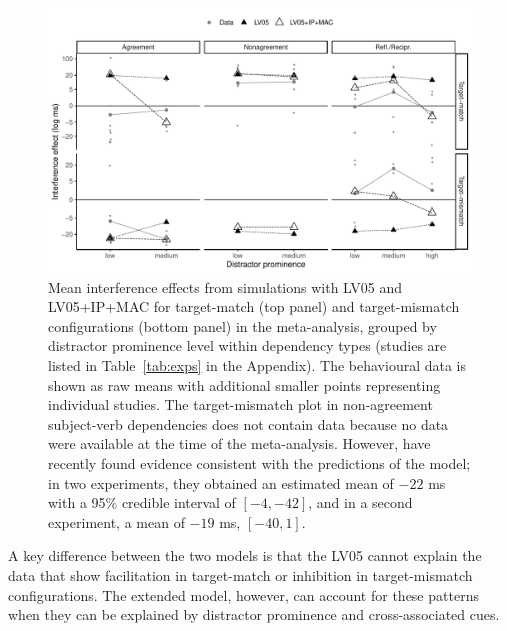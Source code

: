 \documentclass{cambridge7A}\usepackage[]{graphicx}\usepackage[]{color}
\begin{document}
\begin{figure}[!htbp]
\centering
\includegraphics[width=\textwidth]{figures/fig-simresults}

%
  \caption{Mean interference effects from simulations with LV05 and LV05+IP+MAC for target-match (top panel) and target-mismatch configurations (bottom panel) in the \cite{JaegerEngelmannVasishth2017} meta-analysis, grouped by distractor prominence level within dependency types (studies are listed in Table~\ref{tab:exps} in the Appendix). The behavioural data is shown as raw means with additional smaller points representing individual studies. The target-mismatch plot in non-agreement subject-verb dependencies does not contain data because no data were available at the time of the meta-analysis. However, \cite{CunningsSturt2018} have recently found evidence consistent with the predictions of the model; in two experiments, they obtained an estimated mean of  $-22$ ms with a 95\% credible interval of $[-4,-42]$, and  in a second experiment, a mean of $-19$ ms, $[-40,1]$.
  }
  \label{fig:simresults} 
\end{figure}
%



A key difference between the two models is that the LV05 cannot explain the data that show facilitation in target-match or inhibition in target-mismatch configurations. The extended model, however, can account for these patterns when they can be explained by distractor prominence and cross-associated cues.
\end{document}
